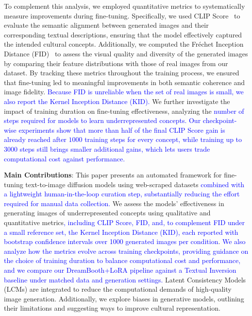\documentclass[pdflatex,sn-mathphys-num]{sn-jnl}%
\theoremstyle{thmstyleone}%
\theoremstyle{thmstyletwo}%
\theoremstyle{thmstylethree}%
\begin{document}
To complement this analysis, we employed quantitative metrics to systematically measure improvements during fine-tuning. Specifically, we used CLIP Score~\cite{hessel2021clipscore} to evaluate the semantic alignment between generated images and their corresponding textual descriptions, ensuring that the model effectively captured the intended cultural concepts. Additionally, we computed the Fréchet Inception Distance (FID)~\cite{heusel2018ganstrainedtimescaleupdate} to assess the visual quality and diversity of the generated images by comparing their feature distributions with those of real images from our dataset. By tracking these metrics throughout the training process, we ensured that fine-tuning led to meaningful improvements in both semantic coherence and image fidelity. \textcolor{blue}{Because FID is unreliable when the set of real images is small, we also report the Kernel Inception Distance (KID).} We further investigate the impact of training duration on fine-tuning effectiveness, analyzing the \textcolor{blue}{number of steps required for models to learn underrepresented concepts. Our checkpoint-wise experiments show that more than half of the final CLIP Score gain is already reached after $1000$ training steps for every concept, while training up to $3000$ steps still brings smaller additional gains, which lets users trade computational cost against performance.}


\textbf{Main Contributions}: This paper presents an automated framework for fine-tuning text-to-image diffusion models using web-scraped datasets \textcolor{blue}{ combined with a lightweight human-in-the-loop curation step, substantially reducing the effort required for manual data collection.} We assess the models' effectiveness in generating images of underrepresented concepts using qualitative and quantitative metrics\textcolor{blue}{, including CLIP Score, FID, and, to complement FID under a small reference set, the Kernel Inception Distance (KID), each reported with bootstrap confidence intervals over 1000 generated images per condition}. \textcolor{blue}{We also analyze how the metrics evolve across training checkpoints, providing guidance on the choice of training duration to balance computational cost and performance, and we compare our DreamBooth+LoRA pipeline against a Textual Inversion baseline under matched data and generation settings.} Latent Consistency Models (LCMs) are integrated to reduce the computational demands of high-quality image generation. Additionally, we explore biases in generative models, outlining their limitations and suggesting ways to improve cultural representation.
\end{document}
